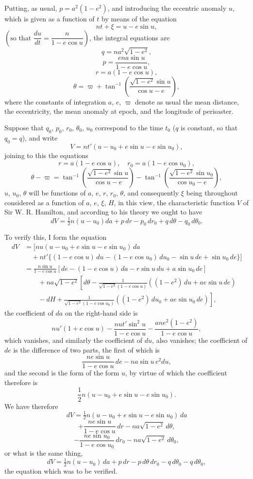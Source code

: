 \documentclass[11pt,a4paper]{book}
\begin{document}
Putting, as usual, $p = a^2(1 - e^2)$, and introducing the eccentric anomaly $u$, which is given
as a function of $t$ by means of the equation
\[
nt + \xi = u - e\sin u,
\]
$\left(\text{so that }\dfrac{du}{dt} = \dfrac{n}{1 - e\cos u}\right)$, the integral equations are
\[
q = na^2\sqrt{1 - e^2},
\]
\[
p = \frac{ena\sin u}{1 - e\cos u},
\]
\[
r = a(1 - e\cos u),
\]
\[
\theta = \varpi + \tan^{-1}\left(\frac{\sqrt{1-e^2}\sin u}{\cos u - e}\right),
\]
where the constants of integration $a$, $e$, $\varpi$ denote as usual the mean distance, the
eccentricity, the mean anomaly at epoch, and the longitude of perisaster.

Suppose that $q_0$, $p_0$, $r_0$, $\theta_0$, $u_0$ correspond to the time $t_0$ ($q$ is constant, so that
$q_0 = q$), and write
\[
V = nt'(u - u_0 + e\sin u - e\sin u_0),
\]
joining to this the equations
\[
r = a(1 - e\cos u),\quad r_0 = a(1 - e\cos u_0),
\]
\[
\theta - \varpi = \tan^{-1}\left(\frac{\sqrt{1-e^2}\sin u}{\cos u - e}\right) - \tan^{-1}\left(\frac{\sqrt{1-e^2}\sin u_0}{\cos u_0 - e}\right),
\]
$u$, $u_0$, $\theta$ will be functions of $a$, $e$, $r$, $r_0$, $\theta$, and consequently $\xi$ being throughout considered
as a function of $a$, $e$, $\xi$, $H$, in this view, the characteristic function $V$ of
Sir W. R. Hamilton, and according to his theory we ought to have
\[
dV = \tfrac{1}{2}n(u - u_0)da + p\,dr - p_0\,dr_0 + q\,d\theta - q_0\,d\theta_0.
\]

To verify this, I form the equation
\begin{align*}
dV &= [nu(u - u_0 + e\sin u - e\sin u_0)\,da\\
&\quad + nt'\{(1 - e\cos u)\,du - (1 - e\cos u_0)\,du_0 - \sin u\,de + \sin u_0\,de\}]\\
&= \frac{n\sin u}{1 - e\cos u}\left[de - (1 - e\cos u)\,da - r\sin u\,du + a\sin u_0\,de\right]\\
&\qquad + na\sqrt{1 - e^2}\left[d\theta - \frac{1}{\sqrt{1-e^2}(1 - e\cos u)}((1 - e^2)\,du + ae\sin u\,de)\right.\\
&\qquad - dH + \left.\frac{1}{\sqrt{1-e^2}(1 - e\cos u_0)}((1 - e^2)\,du_0 + ae\sin u_0\,de)\right],
\end{align*}
the coefficient of $da$ on the right-hand side is
\[
nu'(1 + e\cos u) - \frac{nut'\sin^2 u}{1 - e\cos u} - \frac{ane^2(1 - e^2)}{1 - e\cos u},
\]
which vanishes, and similarly the coefficient of $du$, also vanishes; the coefficient of $de$
is the difference of two parts, the first of which is
\[
\frac{ne\sin u}{1 - e\cos u}\,de - na\sin u\,e^2 du,
\]
and the second is the form of the form $u$, by virtue of which the coefficient therefore is
\[
\frac{1}{2}n(u - u_0 + e\sin u - e\sin u_0).
\]
We have therefore
\[
dV = \tfrac{1}{2}n(u - u_0 + e\sin u - e\sin u_0)\,da
\]
\[
+ \frac{ne\sin u}{1 - e\cos u}\,dr - na\sqrt{1 - e^2}\,d\theta,
\]
\[
- \frac{ne\sin u_0}{1 - e\cos u_0}\,dr_0 - na\sqrt{1 - e^2}\,d\theta_0,
\]
or what is the same thing,
\[
dV = \tfrac{1}{2}n(u - u_0)\,da + p\,dr - p\,d\theta\,dr_0 - q\,d\theta_0 - q\,d\theta_0,
\]
the equation which was to be verified.
\end{document}
